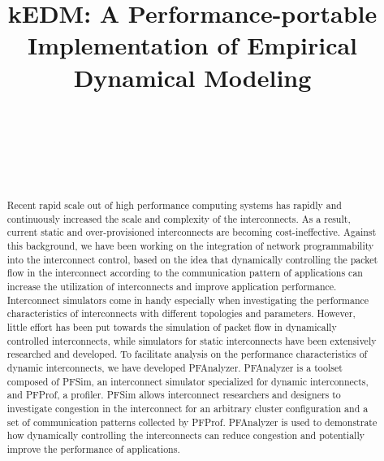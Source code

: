 \documentclass[conference]{IEEEtran}
\begin{document}
\title{kEDM: A Performance-portable Implementation of Empirical Dynamical Modeling}

\author{%
     \\
    \and
     \\
    \and
     \\
}

\maketitle

\begin{abstract}
    Recent rapid scale out of high performance computing systems has
    rapidly and continuously increased the scale and complexity of the
    interconnects. As a result, current static and over-provisioned
    interconnects are becoming cost-ineffective. Against this background, we have
    been working on the integration of network programmability into
    the interconnect control, based on the idea that dynamically controlling
    the packet flow in the interconnect according to the communication pattern
    of applications can increase the utilization of interconnects and improve
    application performance. Interconnect simulators come in handy especially
    when investigating the performance characteristics of interconnects with
    different topologies and parameters. However, little effort has been put
    towards the simulation of packet flow in dynamically controlled interconnects,
    while simulators for static interconnects have been extensively researched
    and developed. To facilitate analysis on the performance
    characteristics of dynamic interconnects, we have developed PFAnalyzer.
    PFAnalyzer is a toolset composed of PFSim, an interconnect simulator
    specialized for dynamic interconnects, and PFProf, a profiler.
    PFSim allows interconnect researchers and designers to investigate
    congestion in the interconnect for an arbitrary cluster configuration and
    a set of communication patterns collected by PFProf. PFAnalyzer is used
    to demonstrate how dynamically controlling the interconnects can reduce
    congestion and potentially improve the performance of applications.
\end{abstract}
\end{document}
